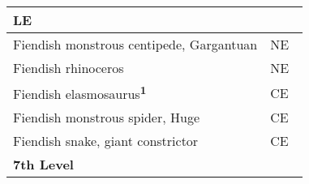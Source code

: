 \begin{longtable}{llll}
{\begin{minipage}[t]{0.601in}
LE\end{minipage}}\\
\hline
\multicolumn{1}{|p{3.326in}|}{\begin{minipage}[t]{3.326in}\raggedright
Fiendish monstrous centipede, Gargantuan\end{minipage}} & \multicolumn{3}{p{0.601in}|}{\begin{minipage}[t]{0.601in}\raggedright
NE\end{minipage}}\\
\hline
\multicolumn{1}{|p{3.326in}|}{\begin{minipage}[t]{3.326in}\raggedright
Fiendish rhinoceros\end{minipage}} & \multicolumn{3}{p{0.601in}|}{\begin{minipage}[t]{0.601in}\raggedright
NE\end{minipage}}\\
\hline
\multicolumn{1}{|p{3.326in}|}{\begin{minipage}[t]{3.326in}\raggedright
Fiendish elasmosaurus\textsuperscript{\textbf{1}}\end{minipage}} & \multicolumn{3}{p{0.601in}|}{\begin{minipage}[t]{0.601in}\raggedright
CE\end{minipage}}\\
\hline
\multicolumn{1}{|p{3.326in}|}{\begin{minipage}[t]{3.326in}\raggedright
Fiendish monstrous spider, Huge\end{minipage}} & \multicolumn{3}{p{0.601in}|}{\begin{minipage}[t]{0.601in}\raggedright
CE\end{minipage}}\\
\hline
\multicolumn{1}{|p{3.326in}|}{\begin{minipage}[t]{3.326in}\raggedright
Fiendish snake, giant constrictor\end{minipage}} & \multicolumn{3}{p{0.601in}|}{\begin{minipage}[t]{0.601in}\raggedright
CE\end{minipage}}\\
\hline
\multicolumn{1}{|p{3.326in}|}{\begin{minipage}[t]{3.326in}\raggedright
\textbf{7th Level}\end{minipage}} & \multicolumn{3}{p{0.601in}|}{\begin{minipage}[t]{0.601in}\raggedright
\end{minipage}}\\

\end{longtable}
